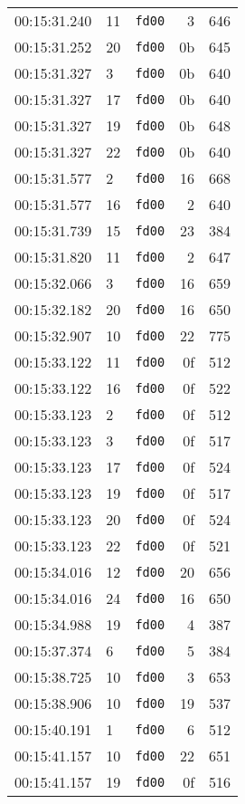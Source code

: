 \documentclass{article}
\begin{document}
\begin{longtable}{lllrr}
00:15:31.240 & 11 & \texttt{fd00} & 3 & 646 \\
00:15:31.252 & 20 & \texttt{fd00} & 0b & 645 \\
00:15:31.327 & 3 & \texttt{fd00} & 0b & 640 \\
00:15:31.327 & 17 & \texttt{fd00} & 0b & 640 \\
00:15:31.327 & 19 & \texttt{fd00} & 0b & 648 \\
00:15:31.327 & 22 & \texttt{fd00} & 0b & 640 \\
00:15:31.577 & 2 & \texttt{fd00} & 16 & 668 \\
00:15:31.577 & 16 & \texttt{fd00} & 2 & 640 \\
00:15:31.739 & 15 & \texttt{fd00} & 23 & 384 \\
00:15:31.820 & 11 & \texttt{fd00} & 2 & 647 \\
00:15:32.066 & 3 & \texttt{fd00} & 16 & 659 \\
00:15:32.182 & 20 & \texttt{fd00} & 16 & 650 \\
00:15:32.907 & 10 & \texttt{fd00} & 22 & 775 \\
00:15:33.122 & 11 & \texttt{fd00} & 0f & 512 \\
00:15:33.122 & 16 & \texttt{fd00} & 0f & 522 \\
00:15:33.123 & 2 & \texttt{fd00} & 0f & 512 \\
00:15:33.123 & 3 & \texttt{fd00} & 0f & 517 \\
00:15:33.123 & 17 & \texttt{fd00} & 0f & 524 \\
00:15:33.123 & 19 & \texttt{fd00} & 0f & 517 \\
00:15:33.123 & 20 & \texttt{fd00} & 0f & 524 \\
00:15:33.123 & 22 & \texttt{fd00} & 0f & 521 \\
00:15:34.016 & 12 & \texttt{fd00} & 20 & 656 \\
00:15:34.016 & 24 & \texttt{fd00} & 16 & 650 \\
00:15:34.988 & 19 & \texttt{fd00} & 4 & 387 \\
00:15:37.374 & 6 & \texttt{fd00} & 5 & 384 \\
00:15:38.725 & 10 & \texttt{fd00} & 3 & 653 \\
00:15:38.906 & 10 & \texttt{fd00} & 19 & 537 \\
00:15:40.191 & 1 & \texttt{fd00} & 6 & 512 \\
00:15:41.157 & 10 & \texttt{fd00} & 22 & 651 \\
00:15:41.157 & 19 & \texttt{fd00} & 0f & 516 \\

\end{longtable}
\end{document}
